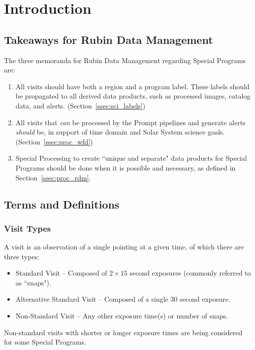 \section{Introduction} \label{sec:intro}

\subsection{Takeaways for Rubin Data Management}

The three memoranda for Rubin Data Management regarding Special Programs are:
\begin{enumerate}
\item All visits should have both a region and a program label.
These labels should be propagated to all derived data products, such as
processed images, catalog data, and alerts. (Section~\ref{ssec:sci_labels})
\item All visits that \emph{can} be processed by the Prompt pipelines and generate 
alerts \emph{should} be, in support of time domain and Solar System science goals. (Section~\ref{ssec:proc_wfd})
\item Special Processing to create ``unique and separate" data products for Special Programs
should be done when it is possible and necessary, as defined in Section~\ref{ssec:proc_rdm}.
\end{enumerate}

\subsection{Terms and Definitions}\label{ssec:intro_terms}

\subsubsection{Visit Types}

A visit is an observation of a single pointing at a given time, of which 
there are three types:

\begin{itemize}
\item Standard Visit -- Composed of $2\times15$ second exposures (commonly referred to as ``snaps").
\item Alternative Standard Visit -- Composed of a single $30$ second exposure.
\item Non-Standard Visit -- Any other exposure time(s) or number of snaps.
\end{itemize}

Non-standard visits with shorter or longer exposure times are being 
considered for some Special Programs.

